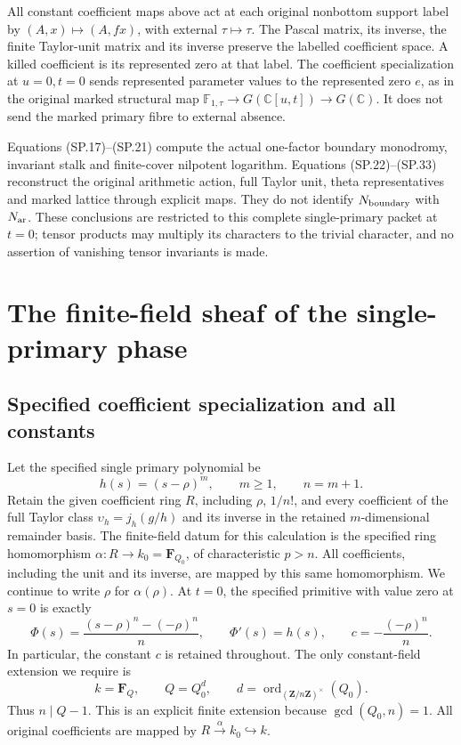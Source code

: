 All constant coefficient maps above act at each original
nonbottom support label by
\((A,x)\mapsto(A,fx)\), with external \(\tau\mapsto\tau\).
The Pascal matrix, its inverse, the finite Taylor-unit
matrix and its inverse preserve the labelled coefficient
space. A killed coefficient is its represented zero at
that label. The coefficient specialization at \(u=0,t=0\)
sends represented parameter values to the represented
zero \(e\), as in the original marked structural map
\(\mathbb F_{1,\tau}\to G(\mathbb C[u,t])\to G(\mathbb C)\).
It does not send the marked primary fibre to external
absence.

Equations (SP.17)--(SP.21) compute the actual one-factor
boundary monodromy, invariant stalk and finite-cover
nilpotent logarithm. Equations (SP.22)--(SP.33) reconstruct
the original arithmetic action, full Taylor unit, theta
representatives and marked lattice through explicit maps.
They do not identify \(N_{\rm boundary}\) with \(N_{\rm ar}\).
These conclusions are restricted to this complete
single-primary packet at \(t=0\); tensor products may
multiply its characters to the trivial character, and
no assertion of vanishing tensor invariants is made.

\section{The finite-field sheaf of the single-primary phase}
\label{sec:SPF}

\subsection{Specified coefficient specialization and all constants}

Let the specified single primary polynomial be
\[
 h(s)=(s-\rho)^m,\qquad m\geq1,\qquad n=m+1.
 \tag{SPF.1}\label{eq:SPF1}
\]
Retain the given coefficient ring \(R\), including \(\rho\), \(1/n!\),
and every coefficient of the full Taylor class
\(\upsilon_h=j_h(g/h)\) and its inverse in the retained
\(m\)-dimensional remainder basis.
The finite-field datum for this calculation is the specified ring
homomorphism
\(\alpha:R\longrightarrow k_0=\mathbf F_{Q_0}\), of characteristic
\(p>n\). All coefficients, including the unit and its inverse, are
mapped by this same homomorphism. We continue to write \(\rho\) for
\(\alpha(\rho)\). At \(t=0\), the specified primitive with value zero
at \(s=0\) is exactly
\[
 \Phi(s)=\frac{(s-\rho)^n-(-\rho)^n}{n},\qquad
 \Phi'(s)=h(s),\qquad
 c=-\frac{(-\rho)^n}{n}.
 \tag{SPF.2}\label{eq:SPF2}
\]
In particular, the constant \(c\) is retained throughout. The only
constant-field extension we require is
\[
 k=\mathbf F_Q,\qquad Q=Q_0^d,\qquad
 d=\operatorname{ord}_{(\mathbf Z/n\mathbf Z)^\times}(Q_0).
 \tag{SPF.3}\label{eq:SPF3}
\]
Thus \(n\mid Q-1\). This is an explicit finite extension because
\(\gcd(Q_0,n)=1\). All original coefficients are mapped by
\(R\xrightarrow{\alpha}k_0\hookrightarrow k\).

